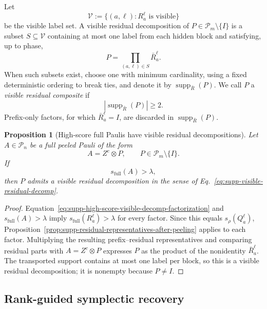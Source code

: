 \documentclass[
  aps,
  prx,
  reprint,
  superscriptaddress,
  amsmath,
  amssymb,
  nofootinbib,
  longbibliography
]{revtex4-2}
\newtheorem{proposition}[theorem]{Proposition}
\newcommand{\supp}{\operatorname{supp}}
\newcommand{\Pc}{\mathcal{P}}
\begin{document}
Let
\begin{equation}
\mathcal V
:=
\{(a,\ell):R_a^\ell\text{ is visible}\}
\end{equation}
be the visible label set.  A visible residual decomposition of
$P\in\Pc_m\setminus\{I\}$ is a subset
$S\subseteq \mathcal V$
containing at most one label from each hidden block and satisfying, up to
phase,
\begin{equation}
P
=
\prod_{(a,\ell)\in S}
\bar R_a^\ell .
\label{eq:supp-visible-residual-decomp}
\end{equation}
When such subsets exist, choose one with minimum cardinality, using a fixed
deterministic ordering to break ties, and denote it by
$\supp_{\bar R}(P)$.  We call $P$ a \emph{visible residual composite} if
\begin{equation}
|\supp_{\bar R}(P)|\ge 2.
\end{equation}
Prefix-only factors, for which $\bar R_a^\ell=I$, are discarded in
$\supp_{\bar R}(P)$.

\begin{proposition}[High-score full Paulis have visible residual decompositions]
\label{prop:supp-high-score-visible-residual-decomposition}
Let $A\in\Pc_n$ be a full peeled Pauli of the form
\begin{equation}
A=Z^c\otimes P,
\qquad
P\in\Pc_m\setminus\{I\}.
\end{equation}
If
\begin{equation}
s_{\mathrm{full}}(A)>\lambda,
\label{eq:supp-high-score-visible-decomp-condition}
\end{equation}
then $P$ admits a visible residual decomposition in the sense of
Eq.~\eqref{eq:supp-visible-residual-decomp}.
\end{proposition}

\begin{proof}
Equation~\eqref{eq:supp-high-score-visible-decomp-factorization} and
$s_{\mathrm{full}}(A)>\lambda$ imply
$s_{\mathrm{full}}(R_a^\ell)>\lambda$ for every factor.  Since this equals
$s_\rho(Q_a^\ell)$,
Proposition~\ref{prop:supp-residual-representatives-after-peeling} applies to
each factor.  Multiplying the resulting prefix--residual representatives and
comparing residual parts with $A=Z^c\otimes P$ expresses $P$ as the product
of the nonidentity $\bar R_a^\ell$.  The transported support contains at most
one label per block, so this is a visible residual decomposition; it is
nonempty because $P\ne I$.
\end{proof}

\subsection{Rank-guided symplectic recovery}
\end{document}
